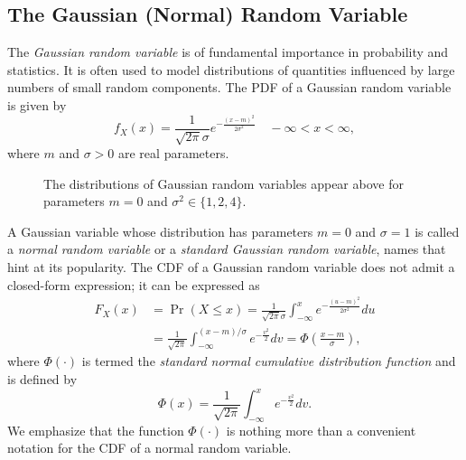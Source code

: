\subsection{The Gaussian (Normal) Random Variable}

The \emph{Gaussian random variable} is of fundamental importance in probability and statistics. 
It is often used to model distributions of quantities influenced by large numbers of small random components.
The PDF of a Gaussian random variable is given by
\begin{equation*}
f_X (x) = \frac{1}{\sqrt{2 \pi} \sigma} e^{- \frac{(x - m)^2}{2 \sigma^2}}
\quad - \infty < x < \infty,
\end{equation*}
where $m$ and $\sigma > 0$ are real parameters.

\begin{figure}[ht]
\begin{center}
\end{center}
\caption{The distributions of Gaussian random variables appear above for parameters $m = 0$ and $\sigma^2 \in \{ 1, 2, 4 \}$.}
\end{figure}

A Gaussian variable whose distribution has parameters $m = 0$ and $\sigma = 1$ is called a \emph{normal random variable} or a \emph{standard Gaussian random variable}, names that hint at its popularity. 
The CDF of a Gaussian random variable does not admit a closed-form expression; it can be expressed as
\begin{equation*}
\begin{split}
F_X (x) &= \Pr (X \leq x)
= \frac{1}{\sqrt{2 \pi} \sigma}
\int_{- \infty}^{x} e^{- \frac{(u - m)^2}{2 \sigma^2}} du \\
&= \frac{1}{\sqrt{2 \pi}}
\int_{- \infty}^{(x - m)/\sigma} e^{- \frac{v^2}{2}} dv
= \Phi \left( \frac{x - m}{\sigma} \right),
\end{split}
\end{equation*}
where $\Phi (\cdot)$ is termed the \emph{standard normal cumulative distribution function} and is defined by
\begin{equation*}
\Phi (x) = 
\frac{1}{\sqrt{2 \pi}} \int_{-\infty}^x e^{-\frac{v^2}{2}} dv .
\end{equation*}
We emphasize that the function $\Phi (\cdot)$ is nothing more than a convenient notation for the CDF of a normal random variable.

